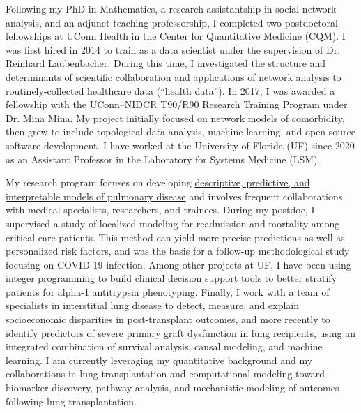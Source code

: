 \documentclass{nihbiosketch}
\begin{document}
\begin{statement}

Following my PhD in Mathematics, a research assistantship in social network analysis, and an adjunct teaching professorship, I completed two postdoctoral fellowships at UConn Health in the Center for Quantitative Medicine (CQM).
I was first hired in 2014 to train as a data scientist under the supervision of Dr. Reinhard Laubenbacher.
During this time, I investigated the structure and determinants of scientific collaboration and applications of network analysis to routinely-collected healthcare data (``health data'').
In 2017, I was awarded a fellowship with the UConn--NIDCR T90/R90 Research Training Program under Dr. Mina Mina.
My project initially focused on network models of comorbidity, then grew to include topological data analysis, machine learning, and open source software development.
I have worked at the University of Florida (UF) since 2020 as an Assistant Professor in the Laboratory for Systems Medicine (LSM).

My research program focuses on developing \uline{descriptive, predictive, and interpretable models of pulmonary disease} and involves frequent collaborations with medical specialists, researchers, and trainees.
During my postdoc, I supervised a study of localized modeling for readmission and mortality among critical care patients. This method can yield more precise predictions as well as personalized risk factors, and was the basis for a follow-up methodological study focusing on COVID-19 infection.
Among other projects at UF, I have been using integer programming to build clinical decision support tools to better stratify patients for alpha-1 antitrypsin phenotyping.
Finally, I work with a team of specialists in interstitial lung disease to detect, measure, and explain socioeconomic disparities in post-transplant outcomes, and more recently to identify predictors of severe primary graft dysfunction in lung recipients, using an integrated combination of survival analysis, causal modeling, and machine learning.
I am currently leveraging my quantitative background and my collaborations in lung transplantation and computational modeling toward biomarker discovery, pathway analysis, and mechanistic modeling of outcomes following lung transplantation.


\end{statement}
\end{document}

